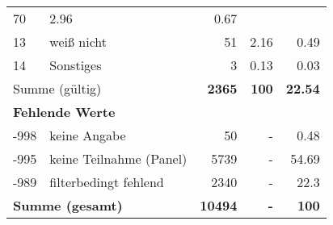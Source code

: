 \begin{longtable}{lXrrr}
       \num{70} &
       \num[round-mode=places,round-precision=2]{2.96} &
         \num[round-mode=places,round-precision=2]{0.67} \\

     13 &
     \multicolumn{1}{X}{ weiß nicht   } &


       \num{51} &
       \num[round-mode=places,round-precision=2]{2.16} &
         \num[round-mode=places,round-precision=2]{0.49} \\

     14 &
     \multicolumn{1}{X}{ Sonstiges   } &


       \num{3} &
       \num[round-mode=places,round-precision=2]{0.13} &
         \num[round-mode=places,round-precision=2]{0.03} \\
     \midrule
     \multicolumn{2}{l}{Summe (gültig)} &
       \textbf{\num{2365}} &
     \textbf{\num{100}} &
       \textbf{\num[round-mode=places,round-precision=2]{22.54}} \\
     \multicolumn{5}{l}{\textbf{Fehlende Werte}}\\
       -998 &
       keine Angabe &
         \num{50} &
        - &
         \num[round-mode=places,round-precision=2]{0.48} \\
       -995 &
       keine Teilnahme (Panel) &
         \num{5739} &
        - &
         \num[round-mode=places,round-precision=2]{54.69} \\
       -989 &
       filterbedingt fehlend &
         \num{2340} &
        - &
         \num[round-mode=places,round-precision=2]{22.3} \\
     \midrule
     \multicolumn{2}{l}{\textbf{Summe (gesamt)}} &
          \textbf{\num{10494}} &
        \textbf{-} &
        \textbf{\num{100}} \\
     \bottomrule
     \end{longtable}
     
